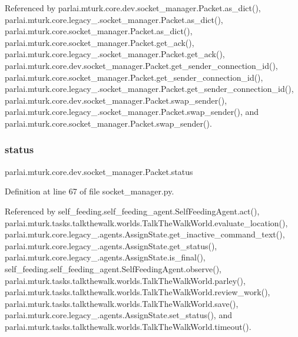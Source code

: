 Referenced by parlai.\+mturk.\+core.\+dev.\+socket\+\_\+manager.\+Packet.\+as\+\_\+dict(), parlai.\+mturk.\+core.\+legacy\+\_.\+socket\+\_\+manager.\+Packet.\+as\+\_\+dict(), parlai.\+mturk.\+core.\+socket\+\_\+manager.\+Packet.\+as\+\_\+dict(), parlai.\+mturk.\+core.\+socket\+\_\+manager.\+Packet.\+get\+\_\+ack(), parlai.\+mturk.\+core.\+legacy\+\_.\+socket\+\_\+manager.\+Packet.\+get\+\_\+ack(), parlai.\+mturk.\+core.\+dev.\+socket\+\_\+manager.\+Packet.\+get\+\_\+sender\+\_\+connection\+\_\+id(), parlai.\+mturk.\+core.\+socket\+\_\+manager.\+Packet.\+get\+\_\+sender\+\_\+connection\+\_\+id(), parlai.\+mturk.\+core.\+legacy\+\_.\+socket\+\_\+manager.\+Packet.\+get\+\_\+sender\+\_\+connection\+\_\+id(), parlai.\+mturk.\+core.\+dev.\+socket\+\_\+manager.\+Packet.\+swap\+\_\+sender(), parlai.\+mturk.\+core.\+legacy\+\_.\+socket\+\_\+manager.\+Packet.\+swap\+\_\+sender(), and parlai.\+mturk.\+core.\+socket\+\_\+manager.\+Packet.\+swap\+\_\+sender().

\mbox{\label{classparlai_1_1mturk_1_1core_1_1dev_1_1socket__manager_1_1Packet_a322b2711fac3332dc676f1d7d3b04a35}} 
\subsubsection{\texorpdfstring{status}{status}}
{\footnotesize\ttfamily parlai.\+mturk.\+core.\+dev.\+socket\+\_\+manager.\+Packet.\+status}



Definition at line 67 of file socket\+\_\+manager.\+py.



Referenced by self\+\_\+feeding.\+self\+\_\+feeding\+\_\+agent.\+Self\+Feeding\+Agent.\+act(), parlai.\+mturk.\+tasks.\+talkthewalk.\+worlds.\+Talk\+The\+Walk\+World.\+evaluate\+\_\+location(), parlai.\+mturk.\+core.\+legacy\+\_.\+agents.\+Assign\+State.\+get\+\_\+inactive\+\_\+command\+\_\+text(), parlai.\+mturk.\+core.\+legacy\+\_.\+agents.\+Assign\+State.\+get\+\_\+status(), parlai.\+mturk.\+core.\+legacy\+\_.\+agents.\+Assign\+State.\+is\+\_\+final(), self\+\_\+feeding.\+self\+\_\+feeding\+\_\+agent.\+Self\+Feeding\+Agent.\+observe(), parlai.\+mturk.\+tasks.\+talkthewalk.\+worlds.\+Talk\+The\+Walk\+World.\+parley(), parlai.\+mturk.\+tasks.\+talkthewalk.\+worlds.\+Talk\+The\+Walk\+World.\+review\+\_\+work(), parlai.\+mturk.\+tasks.\+talkthewalk.\+worlds.\+Talk\+The\+Walk\+World.\+save(), parlai.\+mturk.\+core.\+legacy\+\_.\+agents.\+Assign\+State.\+set\+\_\+status(), and parlai.\+mturk.\+tasks.\+talkthewalk.\+worlds.\+Talk\+The\+Walk\+World.\+timeout().

